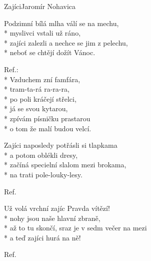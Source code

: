 \documentclass[10.5pt]{book}
\begin{document}
\begin{poem}{Zajíci}{Jaromír Nohavica}

\settowidth{\versewidth}{až to tu skončí, sraz je v sedm večer na mezi}

Podzimní bílá mlha válí se na mechu,\\*
myslivci vstali už ráno,\\*
zajíci zalezli a nechce se jim z pelechu,\\*
neboť se chtějí dožít Vánoc.

Ref.:\\*
Vzduchem zní famfára,\\*
tram-ta-rá ra-ra-ra,\\*
po poli kráčejí střelci,\\*
já se svou kytarou,\\*
zpívám písničku prastarou\\*
o tom že malí budou velcí.

Zajíci naposledy potřásli si tlapkama\\*
a potom oblékli dresy,\\*
začíná specielní slalom mezi brokama,\\*
na trati pole-louky-lesy.

Ref.

Už volá vrchní zajíc Pravda vítězí!\\*
nohy jsou naše hlavní zbraně,\\*
až to tu skončí, sraz je v sedm večer na mezi\\*
a teď zajíci hurá na ně!

Ref.

\end{poem}
\end{document}
